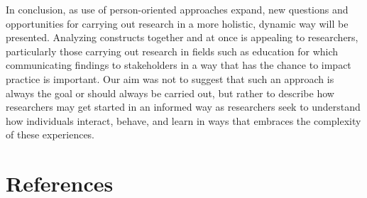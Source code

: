 \documentclass[man]{apa6}
\begin{document}
In conclusion, as use of person-oriented approaches expand, new
questions and opportunities for carrying out research in a more
holistic, dynamic way will be presented. Analyzing constructs together
and at once is appealing to researchers, particularly those carrying out
research in fields such as education for which communicating findings to
stakeholders in a way that has the chance to impact practice is
important. Our aim was not to suggest that such an approach is always
the goal or should always be carried out, but rather to describe how
researchers may get started in an informed way as researchers seek to
understand how individuals interact, behave, and learn in ways that
embraces the complexity of these experiences.

\newpage

\section{References}\label{references}
\end{document}
